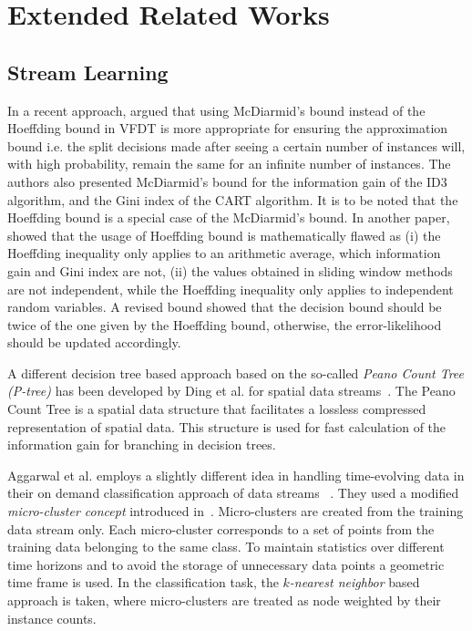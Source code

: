 \chapter{Extended Related Works}
\label{appndx:erw}
\section*{Stream Learning}
In a recent approach, \cite{rutkowski13:vfdt} argued that using McDiarmid’s bound instead of the Hoeffding bound in VFDT is more appropriate for ensuring the approximation bound i.e. the split decisions made after seeing a certain number of instances will, with high probability, remain the same for an infinite number of instances. The authors also presented McDiarmid’s bound for the  information gain of the ID3 algorithm, and the Gini index of the CART algorithm. It is to be noted that the Hoeffding bound is a special case of the McDiarmid’s bound. In another paper, \cite{matuszyk:vfdt} showed that the usage of Hoeffding bound is mathematically flawed as (i) the Hoeffding inequality only applies to an arithmetic average, which information gain and Gini index are not, (ii) the values obtained in sliding window methods are not independent, while the Hoeffding inequality only applies to independent random variables. A revised bound showed that the decision bound should be twice of the one given by the Hoeffding bound, otherwise,  the error-likelihood should be updated accordingly.


A different decision tree based approach based on the so-called \textit{Peano Count Tree (P-tree)} has been developed by Ding et al. for spatial data streams~\cite{ding02:peanocount}. The Peano Count Tree is a spatial data structure that facilitates a lossless compressed representation of spatial data. This structure is used for fast calculation of the information gain for branching in decision trees.

Aggarwal et al. employs a slightly different idea in handling time-evolving data in their on demand classification approach of data streams ~\cite{aggarwal04:ondemand}. They used a modified \textit{micro-cluster concept} introduced in~\cite{aggarwal03:clustream}. Micro-clusters are created from the training data stream only. Each micro-cluster corresponds to a set of points from the training data belonging to the same class. To maintain statistics over different time horizons and to avoid the storage of unnecessary data points a geometric time frame is used. In the classification task, the \textit{$k$-nearest neighbor} based approach is taken, where micro-clusters are treated as node weighted by their instance counts. 

